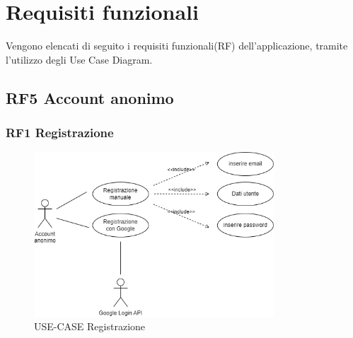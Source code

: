 \documentclass[a4paper,12pt]{article}
\begin{document}
\newpage

\section{Requisiti funzionali}

Vengono elencati di seguito i requisiti funzionali(RF) dell'applicazione, tramite l'utilizzo degli Use Case Diagram.

\subsection*{RF5 Account anonimo}

\subsubsection*{RF1 Registrazione}
\begin{figure}[H]
   \centering
    \includegraphics[width=0.8\textwidth]{img-D2/registrazione_anonimo.png}
    \caption{USE-CASE Registrazione}
\end{figure}
\end{document}
